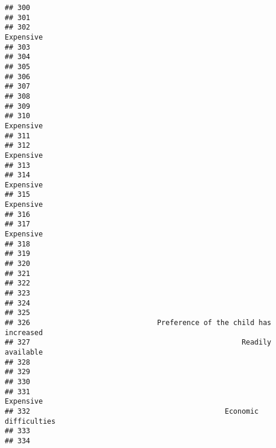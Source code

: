\documentclass[
]{article}
\begin{document}
\begin{verbatim}
## 300                                                                    
## 301                                                                    
## 302                                                          Expensive 
## 303                                                                    
## 304                                                                    
## 305                                                                    
## 306                                                                    
## 307                                                                    
## 308                                                                    
## 309                                                                    
## 310                                                          Expensive 
## 311                                                                    
## 312                                                          Expensive 
## 313                                                                    
## 314                                                          Expensive 
## 315                                                          Expensive 
## 316                                                                    
## 317                                                          Expensive 
## 318                                                                    
## 319                                                                    
## 320                                                                    
## 321                                                                    
## 322                                                                    
## 323                                                                    
## 324                                                                    
## 325                                                                    
## 326                              Preference of the child has increased 
## 327                                                  Readily available 
## 328                                                                    
## 329                                                                    
## 330                                                                    
## 331                                                          Expensive 
## 332                                              Economic difficulties 
## 333                                                                    
## 334                                                                    

\end{verbatim}
\end{document}
